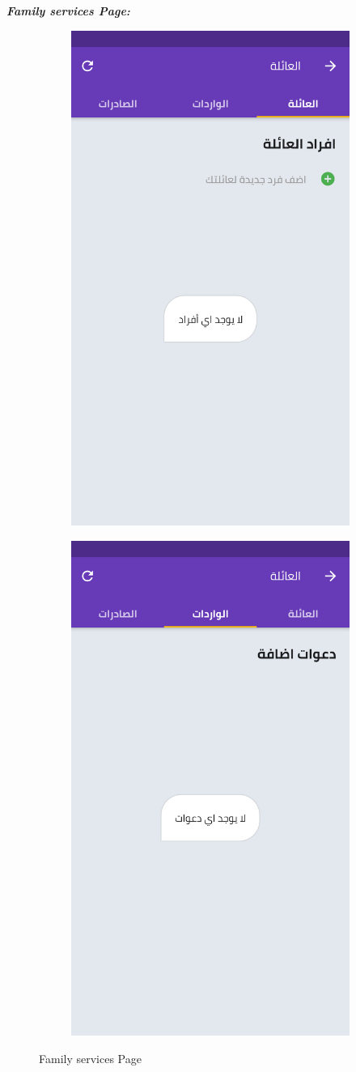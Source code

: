\par  \textbf{\textit{Family services Page:}}

\begin{figure}[H] 
  
  \begin{subfigure}[b]{0.5\linewidth}
    \centering
    \includegraphics[width=0.5\linewidth]{images/ch3/family/0.png}
  
    \label{fig7:a} 
  \end{subfigure}%
    \begin{subfigure}[b]{0.5\linewidth}
    \centering
    \includegraphics[width=0.5\linewidth]{images/ch3/family/1.png}
  
    \label{fig7:b} 
  \end{subfigure}%
  \caption{ Family services Page}
  \label{fig7} 
\end{figure}
